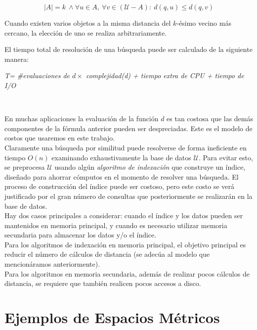 \begin{description}
          \vspace{-3mm}
         \[|A| =k \ \wedge \forall u \in A,\:\forall  v \in ( \mathcal{U} - A) :
          \ d(q,u) \leq d(q,v)\]
          
          Cuando existen varios objetos a la misma distancia del $k$-\'esimo 
          vecino m\'as cercano, la elecci\'on de uno se realiza arbitrariamente.
           
\end{description}

El tiempo total de resoluci\'on de una b\'usqueda puede ser calculado de la
siguiente manera:\\

\centerline{
    \em T= \#evaluaciones  de $d \times $ complejidad(d) +  tiempo extra de CPU + tiempo de  I/O
}
 \
 \
 
En muchas aplicaciones  la evaluaci\'on de la funci\'on $d$ es tan costosa que las dem\'as componentes de la f\'ormula anterior pueden ser despreciadas. Este es el modelo de costos  que usaremos en este trabajo.\\

Claramente una b\'usqueda por similitud puede resolverse de forma ineficiente en tiempo  $O(n)$ examinando exhaustivamente la base de datos $\mathcal{U}$. Para evitar esto, se preprocesa $\mathcal{U}$ usando alg\'un {\em algoritmo de indexaci\'on} que construye  un \'indice, dise\~nado  para ahorrar c\'omputos en el momento de resolver una b\'usqueda. El proceso de  construcci\'on del \'indice puede ser costoso, pero este costo se ver\'a justificado por el gran n\'umero de consultas que posteriormente se realizar\'an en la base de datos.\\

Hay dos casos principales a considerar: cuando el \'indice y los datos pueden ser mantenidos en memoria principal, y cuando es necesario utilizar memoria secundaria para almacenar los datos y/o el \'indice.\\

Para los algoritmos de indexaci\'on en memoria principal, el objetivo principal es reducir el n\'umero de c\'alculos de distancia (se adec\'ua al modelo que mencion\'aramos anteriormente).\\

Para los algoritmos en memoria secundaria, adem\'as de realizar pocos c\'alculos de distancia, se requiere que tambi\'en realicen pocos accesos a disco. 

\section{Ejemplos de Espacios M\'etricos}

